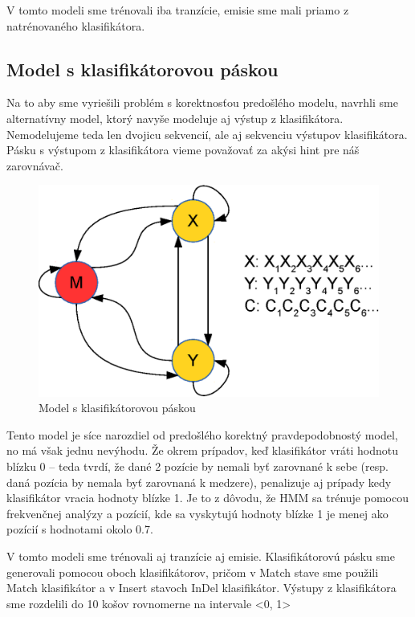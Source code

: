 V tomto modeli sme trénovali iba tranzície, emisie sme mali priamo z natrénovaného klasifikátora.

\subsection{Model s klasifikátorovou páskou}

Na to aby sme vyriešili problém s korektnosťou predošlého modelu, navrhli sme alternatívny model, ktorý navyše modeluje aj výstup z klasifikátora.
Nemodelujeme teda len dvojicu sekvencií, ale aj sekvenciu výstupov klasifikátora.
Pásku s výstupom z klasifikátora vieme považovať za akýsi hint pre náš zarovnávač.

\begin{figure}[htp]
    \centering
    \includegraphics[width=.5\textwidth]{images/model_clf_paska}
    \caption{Model s klasifikátorovou páskou}
\end{figure}


Tento model je síce narozdiel od predošlého korektný pravdepodobnostý model, no má však jednu nevýhodu. Že okrem prípadov, keď klasifikátor vráti hodnotu blízku 0 -- teda tvrdí, že dané 2 pozície by nemali byť zarovnané k sebe (resp. daná pozícia by nemala byť zarovnaná k medzere), penalizuje aj prípady kedy klasifikátor vracia hodnoty blízke 1. Je to z dôvodu, že HMM sa trénuje pomocou frekvenčnej analýzy a pozícií, kde sa vyskytujú hodnoty blízke 1 je menej ako pozícií s hodnotami okolo 0.7.

V tomto modeli sme trénovali aj tranzície aj emisie. Klasifikátorovú pásku sme generovali pomocou oboch klasifikátorov, pričom v Match stave sme použili Match klasifikátor a v Insert stavoch InDel klasifikátor.
Výstupy z klasifikátora sme rozdelili do 10 košov rovnomerne na intervale <0, 1>
